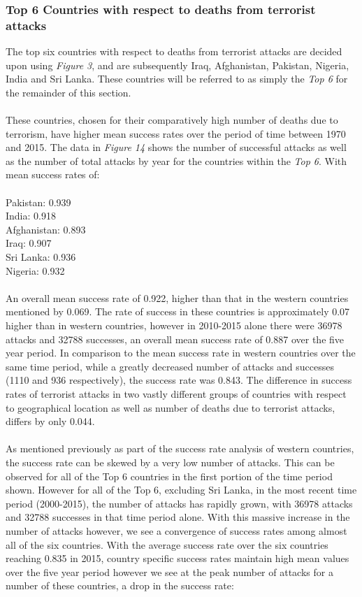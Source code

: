 \documentclass[10pt,a4paper]{article}
\begin{document}
\subsubsection{Top 6 Countries with respect to deaths from terrorist attacks}
The top six countries with respect to deaths from terrorist attacks are decided upon using \textit{Figure 3}, and are subsequently Iraq, Afghanistan, Pakistan, Nigeria, India and Sri Lanka. These countries will be referred to as simply the \textit{Top 6} for the remainder of this section.
\\\\
These countries, chosen for their comparatively high number of deaths due to terrorism, have higher mean success rates over the period of time between 1970 and 2015.
The data in \textit{Figure 14} shows the number of successful attacks as well as the number of total attacks by year for the countries within the \textit{Top 6}. With mean success rates of:
\\\\ 
\indent Pakistan: 0.939\\
\indent India: 0.918\\
\indent Afghanistan: 0.893\\
\indent Iraq: 0.907\\
\indent Sri Lanka: 0.936\\
\indent Nigeria: 0.932\\
\\
An overall mean success rate of 0.922, higher than that in the western countries mentioned by 0.069. The rate of success in these countries is approximately 0.07 higher than in western countries, however in 2010-2015 alone there were 36978 attacks and 32788 successes, an overall mean success rate of 0.887 over the five year period. In comparison to the mean success rate in western countries over the same time period, while a greatly decreased number of attacks and successes (1110 and 936 respectively), the success rate was 0.843. The difference in success rates of terrorist attacks in two vastly different groups of countries with respect to geographical location as well as number of deaths due to terrorist attacks, differs by only 0.044.
\\\\
As mentioned previously as part of the success rate analysis of western countries, the success rate can be skewed by a very low number of attacks. This can be observed for all of the Top 6 countries in the first portion of the time period shown. However for all of the Top 6, excluding Sri Lanka, in the most recent time period (2000-2015), the number of attacks has rapidly grown, with 36978 attacks and 32788 successes in that time period alone. With this massive increase in the number of attacks however, we see a convergence of success rates among almost all of the six countries. With the average success rate over the six countries reaching 0.835 in 2015, country specific success rates maintain high mean values over the five year period however we see at the peak number of attacks for a number of these countries, a drop in the success rate:
\end{document}

